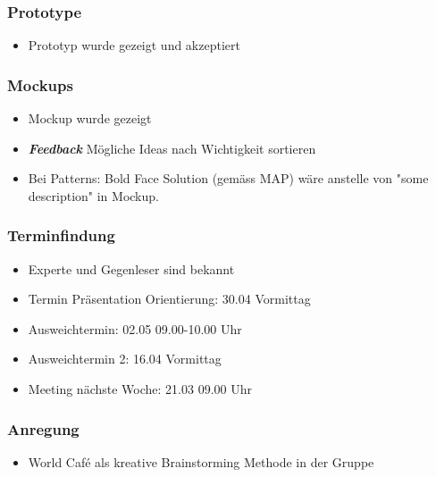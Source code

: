 \hypertarget{prototype}{%
\subsubsection*{Prototype}\label{prototype}}

\begin{itemize}

\item
  Prototyp wurde gezeigt und akzeptiert
\end{itemize}

\hypertarget{mockups}{%
\subsubsection*{Mockups}\label{mockups}}

\begin{itemize}

\item
  Mockup wurde gezeigt
\item
  \emph{\textbf{Feedback}} Mögliche Ideas nach Wichtigkeit sortieren
\item
  Bei Patterns: Bold Face Solution (gemäss MAP) wäre anstelle von "some
  description" in Mockup.
\end{itemize}

\hypertarget{terminfindung}{%
\subsubsection*{Terminfindung}\label{terminfindung}}

\begin{itemize}
\item
  Experte und Gegenleser sind bekannt
\item
  Termin Präsentation Orientierung: 30.04 Vormittag
\item
  Ausweichtermin: 02.05 09.00-10.00 Uhr
\item
  Ausweichtermin 2: 16.04 Vormittag
\item
  Meeting nächste Woche: 21.03 09.00 Uhr
\end{itemize}

\hypertarget{anregung}{%
\subsubsection*{Anregung}\label{anregung}}

\begin{itemize}

\item
  World Café als kreative Brainstorming Methode in der Gruppe
\end{itemize}

